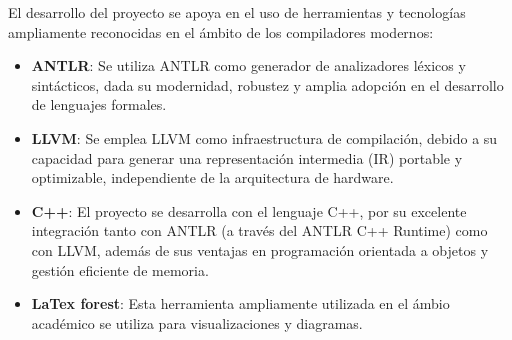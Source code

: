 El desarrollo del proyecto se apoya en el uso de herramientas y tecnologías ampliamente reconocidas en el ámbito de los compiladores modernos:

\begin{itemize}
    \item \textbf{ANTLR}: Se utiliza ANTLR como generador de analizadores léxicos y sintácticos, dada su modernidad, robustez y amplia adopción en el desarrollo de lenguajes formales.

    \item \textbf{LLVM}: Se emplea LLVM como infraestructura de compilación, debido a su capacidad para generar una representación intermedia (IR) portable y optimizable, independiente de la arquitectura de hardware.

    \item \textbf{C++}: El proyecto se desarrolla con el lenguaje C++, por su excelente integración tanto con ANTLR (a través del ANTLR C++ Runtime) como con LLVM, además de sus ventajas en programación orientada a objetos y gestión eficiente de memoria.

    \item \textbf{LaTex forest}: Esta herramienta ampliamente utilizada en el ámbio académico se utiliza para visualizaciones y diagramas. 
\end{itemize}